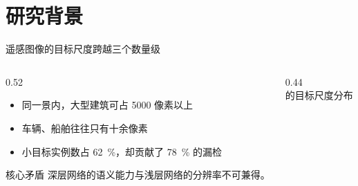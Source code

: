 \section{研究背景}

\begin{frame}{遥感图像的目标尺度跨越三个数量级}
  \begin{columns}[T, onlytextwidth]
    \begin{column}{0.52\textwidth}
      \begin{itemize}
        \setlength{\itemsep}{0.7em}
        \item 同一景内，大型建筑可占 \num{5000} 像素以上
        \item 车辆、船舶往往只有十余像素
        \item 小目标实例数占 \qty{62}{\percent}，却贡献了
              \qty{78}{\percent} 的漏检
      \end{itemize}
      \vspace{1em}
      \begin{alertblock}{核心矛盾}
        深层网络的语义能力与浅层网络的分辨率不可兼得。
      \end{alertblock}
    \end{column}
    \begin{column}{0.44\textwidth}
      \centering
      \\[0.4em]
      {\footnotesize\color{AcadMuted} \dataset{} 的目标尺度分布}
    \end{column}
  \end{columns}
\end{frame}

